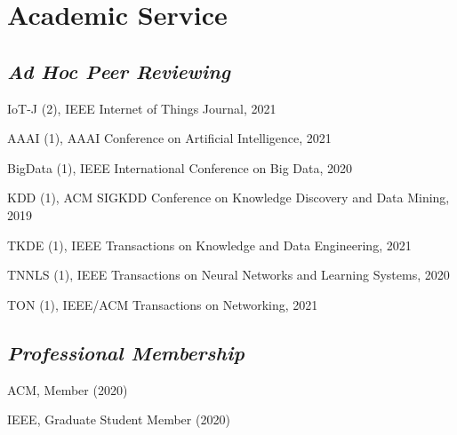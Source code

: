 
\vspace{-8pt}
\section*{Academic Service}
\vspace{-4pt}


\subsection*{\textnormal{\textit{Ad Hoc Peer Reviewing}}}
\vspace{-4pt}
\indent

IoT-J (2), IEEE Internet of Things Journal, 2021

AAAI (1), AAAI Conference on Artificial Intelligence, 2021

BigData (1), IEEE International Conference on Big Data, 2020

KDD (1), ACM SIGKDD Conference on Knowledge Discovery and Data Mining, 2019

TKDE (1), IEEE Transactions on Knowledge and Data Engineering, 2021

TNNLS (1), IEEE Transactions on Neural Networks and Learning Systems, 2020

TON (1), IEEE/ACM Transactions on Networking, 2021

\subsection*{\textnormal{\textit{Professional Membership}}}
\vspace{-4pt}
\indent 

ACM, Member (2020)

IEEE, Graduate Student Member (2020)
